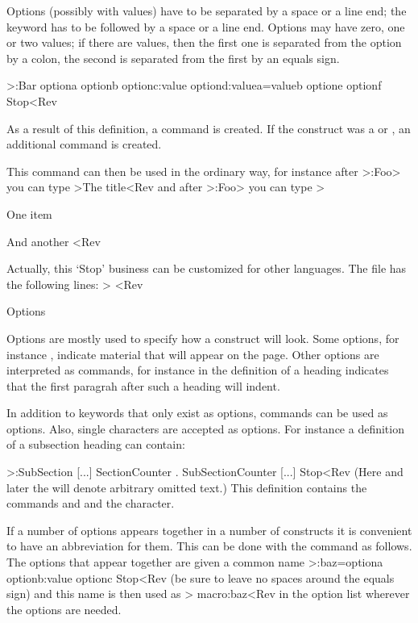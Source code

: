 Options (possibly with values) have to be separated by a
space or a line end; the keyword  has to be followed by a
space or a line end.
Options may have zero, one or two values; if there are values, then
the first one is separated from the option by a colon, the second is
separated from the first by an equals sign.

\Ver>\DefineFoo:Bar optiona optionb optionc:value
    optiond:valuea=valueb optione
    optionf Stop<Rev

 As a result of this definition, a command
 is created. If the  construct was a  or
, an additional command  is created.
 
This command can then be used in the ordinary way, for instance
after \ver>\DefineHeading:Foo> you can type
\Ver>\Foo The title<Rev and after \ver>\DefineList:Foo> you can type
\Ver>\Foo
\item One item
\item And another
\FooStop<Rev

\ImpNote
Actually, this `Stop' business can be customized for other languages.
The file  has the following lines:
\Ver>
\def\stop@command@suffix{Stop}
\def\stop@command{\@command\stop@command@suffix}<Rev
\ImpNoteStop

\Section Options

Options are mostly used to specify how a construct will look. Some
options, for instance , indicate material that will appear
on the page. Other options are interpreted as commands, for instance
 in the definition of a heading indicates that
the first paragrah after such a heading will indent.

In addition to keywords that only exist as options, commands can
be used as options. Also, single characters are accepted as options.
For instance a definition of a subsection heading can contain: 

\Ver>\DefineHeading:SubSection 
    [...]
    SectionCounter . SubSectionCounter
    [...] Stop<Rev
(Here and later the \n{[...]} will denote arbitrary omitted text.)
This definition contains the commands  and
 and the  character.

If a number of options appears together in a number of constructs it
is convenient to have an abbreviation for them. This can be done with the command
 as follows. The options that appear together are
given a common name
 \Ver>\OptionsMacro:baz=optiona optionb:value optionc
    Stop<Rev
(be sure to leave
no spaces around the equals sign) and this name is then used as
 \Ver>    macro:baz<Rev
in the option list wherever the options are needed. 

